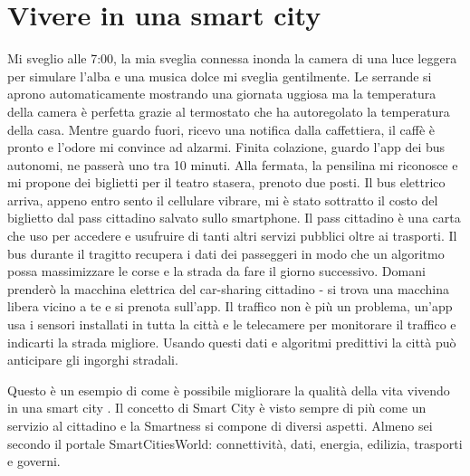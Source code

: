 \section{Vivere in una smart city}
Mi sveglio alle 7:00, la mia sveglia connessa inonda la camera di una luce leggera per simulare l'alba e una musica dolce mi sveglia gentilmente. Le serrande si aprono automaticamente mostrando una giornata uggiosa ma la temperatura della camera è perfetta grazie al termostato che ha autoregolato la temperatura della casa. Mentre guardo fuori, ricevo una notifica dalla caffettiera, il caffè è pronto e l'odore mi convince ad alzarmi. 
Finita colazione, guardo l'app dei bus autonomi, ne passerà uno tra 10 minuti. Alla fermata, la pensilina mi riconosce e mi propone dei biglietti per il teatro stasera, prenoto due posti. Il bus elettrico arriva, appeno entro sento il cellulare vibrare, mi è stato sottratto il costo del biglietto dal pass cittadino salvato sullo smartphone. Il pass cittadino è una carta che uso per accedere e usufruire di tanti altri servizi pubblici oltre ai trasporti. Il bus durante il tragitto recupera i dati dei passeggeri in modo che un algoritmo possa massimizzare le corse e la strada da fare il giorno successivo.
Domani prenderò la macchina elettrica del car-sharing cittadino - si trova una macchina libera vicino a te e si prenota sull'app. Il traffico non è più un problema, un'app usa i sensori installati in tutta la città e le telecamere per monitorare il traffico e indicarti la strada migliore. Usando questi dati e algoritmi predittivi la città può anticipare gli ingorghi stradali.

Questo è un esempio di come è possibile migliorare la qualità della vita vivendo in una smart city \cite{theEconomicAndSocialValue}.
Il concetto di Smart City è visto sempre di più come un servizio al cittadino e la Smartness si compone di diversi aspetti. Almeno sei secondo il portale SmartCitiesWorld: connettività, dati, energia, edilizia, trasporti e governi.

